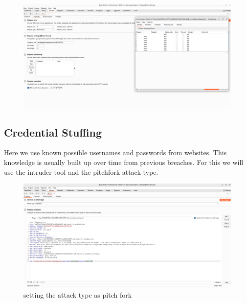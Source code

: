 \documentclass[
	a4paper, %
	12pt, %
]{CSSullivanBusinessReport}
\begin{document}
\begin{fullwidth}
\begin{fullwidth}
    \begin{figure}[H]
    \centering
    \includegraphics[width=1\textwidth]{Images/anikaScreensots/exaustiveBruteForce.png}
    \caption{}
    \label{fig:enter-label}
\end{figure}
\end{fullwidth}






\subsection*{Credential Stuffing}
\begin{fullwidth}
    Here we use known possible usernames and passwords from websites. This knowledge is usually built up over time from previous breaches. For this we will use the intruder tool and the pitchfork attack type.

    
 \begin{figure}[H]
    \centering
    \includegraphics[width=1\textwidth]{Images/anikaScreensots/credentialStuffin1.png}
    \caption{setting the attack type as pitch fork }
    \label{fig:enter-label}
\end{figure}


\end{fullwidth}
\end{fullwidth}
\end{document}
